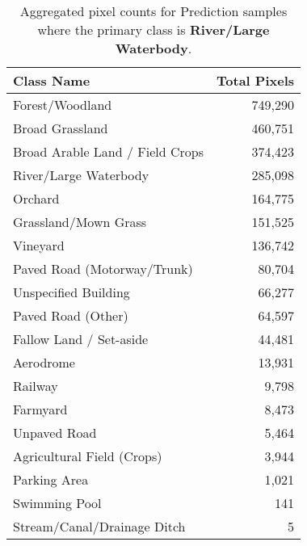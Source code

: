 \begin{table}[H] %
    \centering
    \caption{Aggregated pixel counts for Prediction samples where the primary class is \textbf{River/Large Waterbody}.}
    \label{tab:pred_counts_18}
    \begin{tabular}{lr}
        \hline
        \textbf{Class Name} & \textbf{Total Pixels} \\
        \hline
        Forest/Woodland & 749,290 \\
        Broad Grassland & 460,751 \\
        Broad Arable Land / Field Crops & 374,423 \\
        River/Large Waterbody & 285,098 \\
        Orchard & 164,775 \\
        Grassland/Mown Grass & 151,525 \\
        Vineyard & 136,742 \\
        Paved Road (Motorway/Trunk) & 80,704 \\
        Unspecified Building & 66,277 \\
        Paved Road (Other) & 64,597 \\
        Fallow Land / Set-aside & 44,481 \\
        Aerodrome & 13,931 \\
        Railway & 9,798 \\
        Farmyard & 8,473 \\
        Unpaved Road & 5,464 \\
        Agricultural Field (Crops) & 3,944 \\
        Parking Area & 1,021 \\
        Swimming Pool & 141 \\
        Stream/Canal/Drainage Ditch & 5 \\
        \hline
    \end{tabular}
\end{table}

